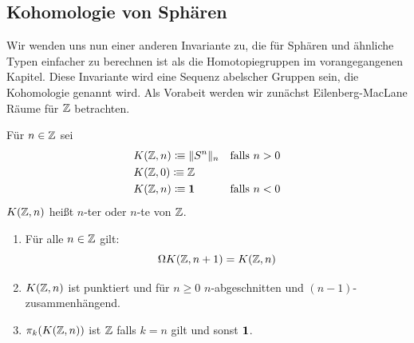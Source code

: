 \subsection{Kohomologie von Sphären}

Wir wenden uns nun einer anderen Invariante zu, die für Sphären und ähnliche Typen einfacher zu berechnen ist als die Homotopiegruppen im vorangegangenen Kapitel.
Diese Invariante wird eine Sequenz abelscher Gruppen sein, die Kohomologie genannt wird.
Als Vorabeit werden wir zunächst Eilenberg-MacLane Räume für \(\mathbb{Z}\) betrachten.

\begin{definition}
  Für \(n\in\mathbb{Z}\) sei
  \begin{align*}
    &K(\mathbb{Z},n)\vcentcolon\mspace{-1.2mu}\equiv \|S^n\|_n &\text{falls \(n>0\)}\\
    &K(\mathbb{Z},0)\vcentcolon\mspace{-1.2mu}\equiv \mathbb{Z} \\
    &K(\mathbb{Z},n)\vcentcolon\mspace{-1.2mu}\equiv \mathbf{1} &\text{falls \(n<0\)}
  \end{align*}
  \(K(\mathbb{Z},n)\) heißt \(n\)-ter  oder
  \(n\)-te  von \(\mathbb{Z}\).
\end{definition}

\begin{lemma}
  \begin{enumerate}
  \item Für alle \(n\in\mathbb{Z}\) gilt:
    \[
      \Omega K(\mathbb{Z},n+1)=K(\mathbb{Z},n)
    \]
  \item \(K(\mathbb{Z},n)\) ist punktiert und für \(n\geq 0\) \(n\)-abgeschnitten und \((n-1)\)-zusammenhängend.
  \item \(\pi_k(K(\mathbb{Z},n))\) ist \(\mathbb{Z}\) falls \(k=n\) gilt und sonst \(\mathbf{1}\).
  \end{enumerate}
\end{lemma}

